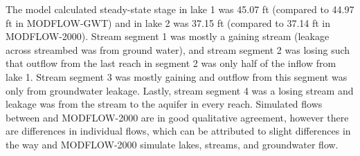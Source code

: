 The \mf model calculated steady-state stage in lake 1 was 45.07 ft (compared to 44.97 ft in MODFLOW-GWT) and in lake 2 was 37.15 ft (compared to 37.14 ft in MODFLOW-2000). Stream segment 1 was mostly a gaining stream (leakage across streambed was from ground water), and stream segment 2 was losing such that outflow from the last reach in segment 2 was only half of the inflow from lake 1. Stream segment 3 was mostly gaining and outflow from this segment was only from groundwater leakage. Lastly, stream segment 4 was a losing stream and leakage was from the stream to the aquifer in every reach.  Simulated flows between \mf and MODFLOW-2000 are in good qualitative agreement, however there are differences in individual flows, which can be attributed to slight differences in the way \mf and MODFLOW-2000 simulate lakes, streams, and groundwater flow.

